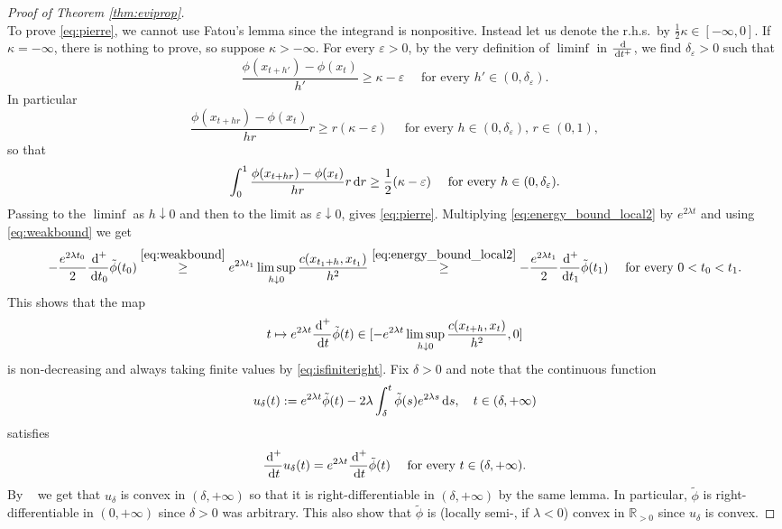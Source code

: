 \documentclass[reqno]{amsart}
\theoremstyle{plain}
\theoremstyle{remark}
\theoremstyle{plain}
\numberwithin{equation}{section}
\theoremstyle{remark}
\newcommand{\R}{\mathbb{R}}
\newcommand{\eps}{\varepsilon}
\newcommand{\de}{{\,\rm d}}
\begin{document}
\begin{proof}[Proof of Theorem \ref{thm:eviprop}]
\begin{equation}
\end{equation}
To prove  \eqref{eq:pierre}, we cannot use Fatou's lemma since the integrand is nonpositive. Instead let us denote the  r.h.s.\  by $\frac{1}{2} \kappa \in [-\infty, 0]$.  If   $\kappa = -\infty$, there is nothing to prove, so suppose $\kappa >-\infty$.  For every $\eps>0$, by  the very  definition of $\liminf$ in $\frac{\de}{\de t^+}$, we  find  $\delta_\eps>0$ such that
\[ \frac{\phi(x_{t+h'})-\phi(x_t)}{h'} \ge \kappa -\eps \quad \text{ for every }  h' \in (0, \delta_\eps).\]
In particular
\[ \frac{\phi(x_{t+hr})-\phi(x_t)}{hr} r \ge r(\kappa -\eps) \quad \text{ for every } h \in (0, \delta_\eps), \, r \in (0,1),\]
so that
\[ \int_0^1 \frac{\phi(x_{t+hr})-\phi(x_t)}{hr} r\de r  \ge \frac{1}{2} (\kappa - \eps) \quad \text{ for every } h \in (0, \delta_\eps).\]
Passing to the $\liminf$ as $h \downarrow 0$ and then to the limit as $\eps \downarrow 0$, gives \eqref{eq:pierre}. Multiplying \eqref{eq:energy_bound_local2} by $e^{2\lambda t}$ and using \eqref{eq:weakbound} we get
\begin{equation}
    -\frac{e^{2\lambda t_0}}{2} \frac{\de^+}{\de t_0} \tilde{\phi}(t_0) \stackrel{\eqref{eq:weakbound}}{\ge} e^{2\lambda t_1} \limsup_{h \downarrow 0} \frac{c(x_{t_1+h}, x_{t_1})}{h^2} \stackrel{\eqref{eq:energy_bound_local2}}{\ge}  -\frac{e^{2\lambda t_1}}{2} \frac{\de^+}{\de t_1} \tilde{\phi}(t_1) \quad \text{ for every } 0<t_0< t_1.
\end{equation}
This shows that the map
\[
t \mapsto e^{2\lambda t} \frac{\de^+}{\de t} \tilde{\phi}(t) \in [ - e^{2\lambda t}\limsup_{h \downarrow 0} \frac{c(x_{t+h}, x_{t})}{h^2}, 0]
\]
is non-decreasing and always taking finite values by \eqref{eq:isfiniteright}. Fix $\delta>0$  and  note that the continuous function
\[
u_\delta(t):= e^{2\lambda t} \tilde{\phi}(t) - 2\lambda \int_\delta^t \tilde{\phi}(s) e^{2\lambda s} \de s, \quad t \in (\delta, +\infty)
\]
satisfies
\[
\frac{\de^+}{\de t} u_\delta(t) = e^{2\lambda t} \frac{\de^+}{\de t} \tilde{\phi}(t) \quad \text{ for every } t \in (\delta, +\infty).
\]
By ~\cite[Lemma 1]{BruOstr62}  we get that $u_\delta$ is convex in $(\delta, +\infty)$ so that it is right-differentiable in $(\delta, +\infty)$ by the same lemma.  In particular, $\tilde{\phi}$ is right-differentiable in $( 0 , +\infty)$ since $\delta>0$ was arbitrary. This also show that $\tilde{\phi}$ is (locally semi-, if $\lambda <0$) convex in  $\R_{>0}$ since $u_\delta$ is convex.


\end{proof}
\end{document}
